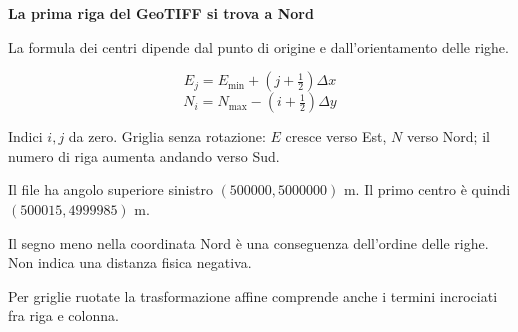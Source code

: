 \documentclass[12pt,aspectratio=1610]{beamer}
\newcommand{\PBody}[1]{\par{\fontsize{11.3}{14.8}\selectfont #1\par}}
\newcommand{\PSmall}[1]{\par{\fontsize{9.8}{13.1}\selectfont #1\par}}
\newcommand{\PInfo}[1]{%
\begin{tcolorbox}[enhanced,arc=1.6mm,boxrule=.55pt,colback=GeoTint,
 colframe=Rule!80!Classical,left=2.3mm,right=2.3mm,top=2mm,bottom=2mm,
 before skip=1mm,after skip=1mm]
\PSmall{#1}\end{tcolorbox}}
\begin{document}
\begin{frame}[plain]\hypertarget{slide9}{}
\begin{lrbox}{\TitleBox}
\begin{minipage}[t]{17.7cm}\raggedright\color{Ink}\fontsize{11.3}{14.8}\selectfont
\color{Navy}\bfseries\fontsize{20.6}{24.5}\selectfont La prima riga del GeoTIFF si trova a Nord
\end{minipage}\end{lrbox}

\begin{lrbox}{\RecallBox}
\begin{minipage}[t]{14.3cm}\raggedright\color{Ink}\fontsize{11.3}{14.8}\selectfont
\fontsize{10.3}{13.8}\selectfont La formula dei centri dipende dal punto di origine e dall’orientamento delle righe.
\end{minipage}\end{lrbox}

\begin{lrbox}{\PilotLeftBox}
\begin{minipage}[t]{10.05cm}\raggedright\color{Ink}\fontsize{11.3}{14.8}\selectfont
\[E_j=E_{\min}+\left(j+\tfrac12\right)\Delta x\]
\[N_i=N_{\max}-\left(i+\tfrac12\right)\Delta y\]
\PInfo{Indici $i,j$ da zero. Griglia senza rotazione: $E$ cresce verso Est, $N$ verso Nord; il numero di riga aumenta andando verso Sud.}

\end{minipage}\end{lrbox}

\begin{lrbox}{\PilotRightBox}
\begin{minipage}[t]{7.55cm}\raggedright\color{Ink}\fontsize{11.3}{14.8}\selectfont
\PBody{Il file ha angolo superiore sinistro $(500000,5000000)$ m. Il primo centro è quindi $(500015,4999985)$ m.}
\vspace{2.5mm}
\PBody{Il segno meno nella coordinata Nord è una conseguenza dell’ordine delle righe. Non indica una distanza fisica negativa.}
\vspace{2.5mm}
\PSmall{Per griglie ruotate la trasformazione affine comprende anche i termini incrociati fra riga e colonna.}

\end{minipage}\end{lrbox}


\end{frame}
\end{document}
